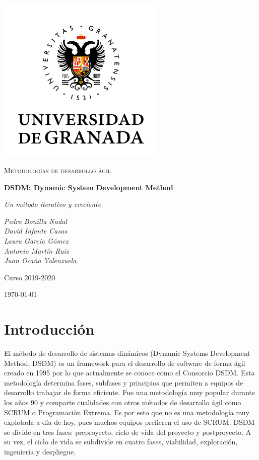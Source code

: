 \documentclass[12pt,a4paper]{article}
\begin{document}
\pgfplotsset{compat=1.15}
\begin{titlepage}
  \centering
  \includegraphics[width=0.6\textwidth]{ugr.png}\par\vspace{1cm}
  {\scshape\large Metodologías de desarrollo ágil \par} \vspace{1cm}
  {\huge\bfseries DSDM: Dynamic System Development Method \par}
  \vspace{0.4cm}
  {\large\itshape Un método iterativo y creciente\\}
  \vspace{0.6cm}
  {\large\itshape  Pedro Bonilla Nadal \\ David Infante Casas \\ Laura García Gómez \\ Antonio Martín Ruiz \\ Juan Ocaña Valenzuela  \par} \vspace{1.00cm}
  Curso 2019-2020 \\
  \vfill

  {\large \today\par}
\end{titlepage}

\tableofcontents
\newpage

\setlength{\parskip}{10pt}
\justify

\section{Introducción}
El método de desarrollo de sistemas dinámicos (Dynamic Systems Development Method, DSDM) es un framework para el desarrollo de software de forma ágil creado en 1995 por lo que actualmente se conoce como el Consorcio DSDM. Esta metodología determina fases, subfases y principios que permiten a equipos de desarrollo trabajar de forma eficiente. Fue una metodología muy popular durante los años 90 y comparte cualidades con otros métodos de desarrollo ágil como SCRUM o Programación Extrema. Es por esto que no es una metodología muy explotada a día de hoy, pues muchos equipos prefieren el uso de SCRUM. DSDM se divide en tres fases: preproyecto, ciclo de vida del proyecto y postproyecto. A su vez, el ciclo de vida se subdivide en cuatro fases, viabilidad, exploración, ingeniería y despliegue.
\end{document}
